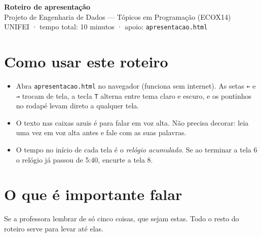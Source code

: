 \documentclass[12pt,a4paper]{article}
\begin{document}
\begin{center}
{\LARGE\bfseries Roteiro de apresentação}\\[0.4em]
{\large Projeto de Engenharia de Dados — Tópicos em Programação (ECOX14)}\\[0.2em]
{\color{cinza} UNIFEI · tempo total: 10 minutos · apoio: \texttt{apresentacao.html}}
\end{center}

\section*{Como usar este roteiro}
\begin{itemize}
  \item Abra \texttt{apresentacao.html} no navegador (funciona sem internet). As setas \texttt{←} e \texttt{→} trocam de tela, a tecla \texttt{T} alterna entre tema claro e escuro, e os pontinhos no rodapé levam direto a qualquer tela.
  \item O texto nas caixas azuis é para falar em voz alta. Não precisa decorar: leia uma vez em voz alta antes e fale com as suas palavras.
  \item O tempo no início de cada tela é o \emph{relógio acumulado}. Se ao terminar a tela 6 o relógio já passou de 5:40, encurte a tela 8.
\end{itemize}

\section{O que é importante falar}

Se a professora lembrar de só cinco coisas, que sejam estas. Todo o resto do roteiro serve para levar até elas.
\end{document}
